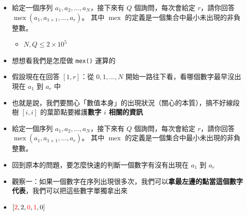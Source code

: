 \documentclass[standalone]{beamer}
\begin{document}
\begin{frame}[fragile]{}
  \begin{itemize}
    \item 
      \begin{problem}
        給定一個序列 $a_1,a_2,\dots,a_N$，接下來有 $Q$ 個詢問，每次會給定 $r$，請你回答 $\operatorname{mex}(a_1,a_{1+1},\dots,a_r)$。
        其中 $\operatorname{mex}$ 的定義是一個集合中最小未出現的非負整數。

        \begin{itemize}
            \item
                $N, Q \leq 2\times 10^5$
        \end{itemize}
      \end{problem}
    \item 想想看我們是怎麼做 \texttt{mex()} 運算的
    \item 假設現在在回答 $[1, r]$：從 $0, 1, \dots, N$ 開始一路往下看，看哪個數字最早沒出現在 $a_1$ 到 $a_r$ 中
    \item 也就是說，我們要關心「數值本身」的出現狀況（關心的本質），搞不好線段樹 $[i, i]$ 的葉節點要維護\textbf{數字 $i$ 相關的資訊} 
  \end{itemize}
\end{frame}

\begin{frame}[fragile]{}
  \begin{itemize}
    \item 
      \begin{problem}
        給定一個序列 $a_1,a_2,\dots,a_N$，接下來有 $Q$ 個詢問，每次會給定 $r$，請你回答 $\operatorname{mex}(a_1,a_{1+1},\dots,a_r)$。
        其中 $\operatorname{mex}$ 的定義是一個集合中最小未出現的非負整數。
      \end{problem}
    \item 回到原本的問題，要怎麼快速的判斷一個數字有沒有出現在 $a_1$ 到 $a_r$
    \item 觀察一：如果一個數字在序列出現很多次，我們可以\textbf{拿最左邊的點當這個數字代表}，我們可以把這些數字單獨拿出來
    \item $[{\color{red} 2}, 2, {\color{red} 0}, {\color{red} 1}, 0]$
  \end{itemize}
\end{frame}
\end{document}
